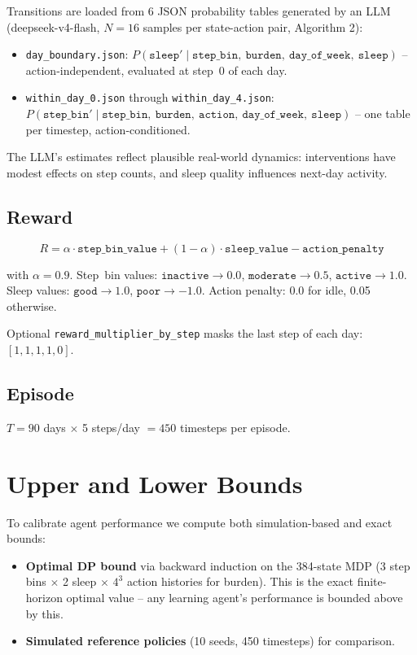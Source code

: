 \documentclass[11pt]{article}
\begin{document}
Transitions are loaded from 6 JSON probability tables generated by an LLM (deepseek-v4-flash, $N = 16$ samples per state-action pair, Algorithm 2):

\begin{itemize}
  \item \texttt{day\_boundary.json}: $P(\texttt{sleep}' \mid \texttt{step\_bin},\ \texttt{burden},\ \texttt{day\_of\_week},\ \texttt{sleep})$ -- action-independent, evaluated at step~0 of each day.
  \item \texttt{within\_day\_0.json} through \texttt{within\_day\_4.json}: $P(\texttt{step\_bin}' \mid \texttt{step\_bin},\ \texttt{burden},\ \texttt{action},\ \texttt{day\_of\_week},\ \texttt{sleep})$ -- one table per timestep, action-conditioned.
\end{itemize}

The LLM's estimates reflect plausible real-world dynamics: interventions have modest effects on step counts, and sleep quality influences next-day activity.

\subsection{Reward}

\[
R = \alpha \cdot \texttt{step\_bin\_value} + (1 - \alpha) \cdot \texttt{sleep\_value} - \texttt{action\_penalty}
\]

with $\alpha = 0.9$. Step~bin values: $\texttt{inactive} \to 0.0$, $\texttt{moderate} \to 0.5$, $\texttt{active} \to 1.0$. Sleep values: $\texttt{good} \to 1.0$, $\texttt{poor} \to -1.0$. Action penalty: 0.0 for idle, 0.05 otherwise.

Optional \texttt{reward\_multiplier\_by\_step} masks the last step of each day: $[1, 1, 1, 1, 0]$.

\subsection{Episode}

$T = 90$ days $\times$ 5 steps/day $= 450$ timesteps per episode.

\section{Upper and Lower Bounds}

To calibrate agent performance we compute both simulation-based and exact bounds:
\begin{itemize}
  \item \textbf{Optimal DP bound} via backward induction on the 384-state MDP (3 step bins $\times$ 2 sleep $\times$ $4^3$ action histories for burden). This is the exact finite-horizon optimal value -- any learning agent's performance is bounded above by this.
  \item \textbf{Simulated reference policies} (10 seeds, 450 timesteps) for comparison.
\end{itemize}
\end{document}
